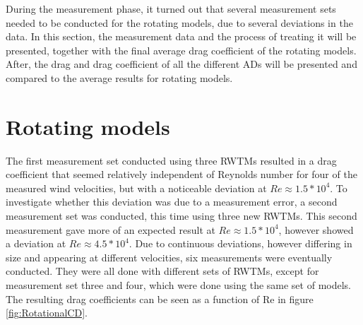 
During the measurement phase, it turned out that several measurement sets needed to be conducted for the rotating models, due to several deviations in the data. In this section, the measurement data and the process of treating it will be presented, together with the final average drag coefficient of the rotating models. After, the drag and drag coefficient of all the different \gls{AD}s will be presented and compared to the average results for rotating models.  



\section{Rotating models}

The first measurement set conducted using three \gls{RWTM}s resulted in a drag coefficient that seemed relatively independent of Reynolds number for four of the measured wind velocities, but with a noticeable deviation at $Re \approx 1.5*10^4$. To investigate whether this deviation was due to a measurement error, a second measurement set was conducted, this time using three new \gls{RWTM}s. This second measurement gave more of an expected result at $Re \approx 1.5*10^4$, however showed a deviation at $Re \approx 4.5*10^4$. Due to continuous deviations, however differing in size and appearing at different velocities, six measurements were eventually conducted. They were all done with different sets of \gls{RWTM}s, except for measurement set three and four, which were done using the same set of models. The resulting drag coefficients can be seen as a function of Re in figure \ref{fig:RotationalCD}.

 

